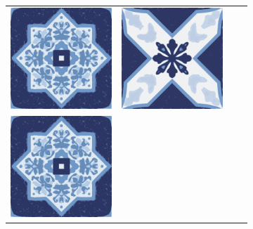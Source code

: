 \documentclass{oci}
\begin{document}
\begin{problemDescription}
\begin{figure}[h]
\begin{subfigure}{0.45\textwidth}
\begin{center}
{\begin{tabular}{cccc}
        \includegraphics[scale=0.3]{a.eps} &
        \includegraphics[scale=0.3]{b.eps} \\
        \includegraphics[scale=0.3]{a.eps} &

\end{tabular}}
\end{center}
\end{subfigure}
\end{figure}
\end{problemDescription}
\end{document}
